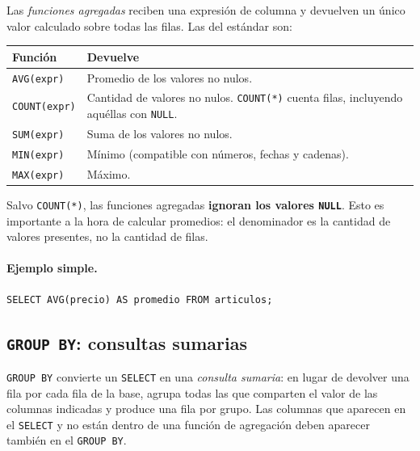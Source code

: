 \documentclass[11pt,a4paper]{article}
\begin{document}
Las \emph{funciones agregadas} reciben una expresión de columna y devuelven
un único valor calculado sobre todas las filas. Las del estándar son:

\begin{center}
\begin{tabular}{@{}l p{10cm}@{}}
\toprule
\textbf{Función} & \textbf{Devuelve} \\
\midrule
\texttt{AVG(expr)}   & Promedio de los valores no nulos. \\
\texttt{COUNT(expr)} & Cantidad de valores no nulos. \texttt{COUNT(*)}
                       cuenta filas, incluyendo aquéllas con \texttt{NULL}. \\
\texttt{SUM(expr)}   & Suma de los valores no nulos. \\
\texttt{MIN(expr)}   & Mínimo (compatible con números, fechas y cadenas). \\
\texttt{MAX(expr)}   & Máximo. \\
\bottomrule
\end{tabular}
\end{center}

\begin{nota}
Salvo \texttt{COUNT(*)}, las funciones agregadas \textbf{ignoran los valores
\texttt{NULL}}. Esto es importante a la hora de calcular promedios: el
denominador es la cantidad de valores presentes, no la cantidad de filas.
\end{nota}

\paragraph{Ejemplo simple.}

\begin{lstlisting}
SELECT AVG(precio) AS promedio FROM articulos;
\end{lstlisting}

\subsection{\texttt{GROUP BY}: consultas sumarias}

\texttt{GROUP BY} convierte un \texttt{SELECT} en una \emph{consulta sumaria}:
en lugar de devolver una fila por cada fila de la base, agrupa todas las que
comparten el valor de las columnas indicadas y produce una fila por grupo.
Las columnas que aparecen en el \texttt{SELECT} y no están dentro de una
función de agregación deben aparecer también en el \texttt{GROUP BY}.
\end{document}
